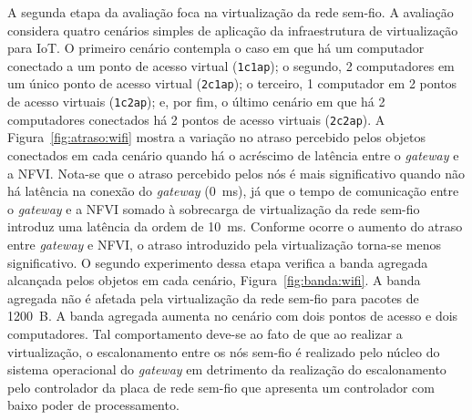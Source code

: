 \documentclass[12pt]{article}
\begin{document}
A segunda etapa da avaliação foca na virtualização da rede sem-fio. A avaliação considera quatro cenários simples de aplicação da infraestrutura de virtualização para IoT. O primeiro cenário contempla o caso em que há um computador conectado a um ponto de acesso virtual 
(\texttt{1c1ap}); o segundo, 2 computadores em um único ponto de acesso virtual (\texttt{2c1ap}); o terceiro, 1 computador em 2 pontos de acesso virtuais (\texttt{1c2ap}); e, por fim, o último cenário em que há 2 computadores conectados há 2 pontos de acesso virtuais (\texttt{2c2ap}). A Figura~\ref{fig:atraso:wifi} mostra a
variação no atraso percebido pelos objetos conectados em cada cenário quando há o acréscimo de latência entre o \textit{gateway} e a NFVI. Nota-se que o atraso percebido pelos nós é mais significativo quando não há latência na conexão do \textit{gateway} (0~ms), já que o tempo de comunicação entre o \textit{gateway} e a NFVI somado à sobrecarga de virtualização da rede sem-fio introduz uma latência da ordem de 10~ms. 
Conforme ocorre o aumento do atraso entre \textit{gateway} e NFVI, 
o atraso introduzido pela virtualização torna-se menos significativo.
O segundo experimento dessa etapa verifica a banda agregada alcançada pelos objetos em cada cenário, Figura~\ref{fig:banda:wifi}. 
A banda agregada não é afetada pela virtualização da rede sem-fio para pacotes de 1200~B. A banda agregada aumenta no cenário com dois pontos de acesso e dois computadores. Tal comportamento deve-se ao fato de que ao realizar a virtualização, o escalonamento entre os nós sem-fio é realizado pelo núcleo do sistema operacional do \textit{gateway} em detrimento da realização do escalonamento pelo controlador da placa de rede sem-fio que apresenta um controlador com baixo poder de processamento. 
\end{document}
